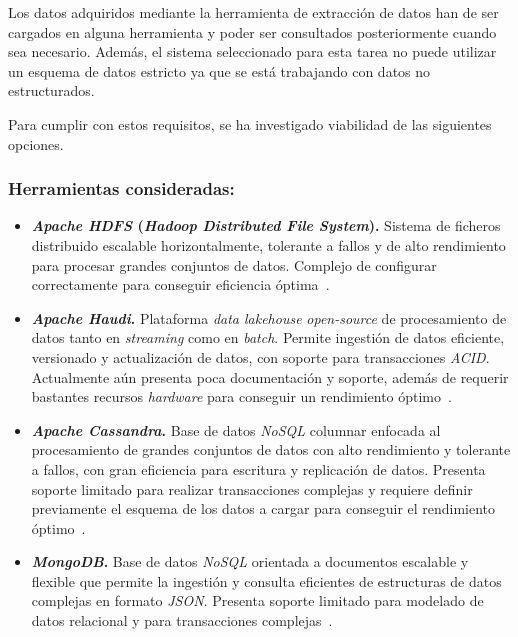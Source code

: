Los datos adquiridos mediante la herramienta de extracción de datos han de ser cargados en alguna herramienta y poder ser consultados posteriormente cuando sea necesario. Además, el sistema seleccionado para esta tarea no puede utilizar un esquema de datos estricto ya que se está trabajando con datos no estructurados.

Para cumplir con estos requisitos, se ha investigado viabilidad de las siguientes opciones.

\subsubsection{Herramientas consideradas:}

\begin{itemize}
    \item \textbf{\textit{Apache HDFS} (\textit{Hadoop Distributed File System}).} Sistema de ficheros distribuido escalable horizontalmente, tolerante a fallos y de alto rendimiento para procesar grandes conjuntos de datos. Complejo de configurar correctamente para conseguir eficiencia óptima~\cite{hdfsArchitecture}.
    \item \textbf{\textit{Apache Haudi}.} Plataforma \textit{data lakehouse} \textit{open-source} de procesamiento de datos tanto en \textit{streaming} como en \textit{batch}. Permite ingestión de datos eficiente, versionado y actualización de datos, con soporte para transacciones \textit{ACID}. Actualmente aún presenta poca documentación y soporte, además de requerir bastantes recursos \textit{hardware} para conseguir un rendimiento óptimo~\cite{hudiOverview}.
    \item \textbf{\textit{Apache Cassandra}.} Base de datos \textit{NoSQL} columnar enfocada al procesamiento de grandes conjuntos de datos con alto rendimiento y tolerante a fallos, con gran eficiencia para escritura y replicación de datos. Presenta soporte limitado para realizar transacciones complejas y requiere definir previamente el esquema de los datos a cargar para conseguir el rendimiento óptimo~\cite{cassandraOverview}.
    \item \textbf{\textit{MongoDB}.} Base de datos \textit{NoSQL} orientada a documentos escalable y flexible que permite la ingestión y consulta eficientes de estructuras de datos complejas en formato \textit{JSON}. Presenta soporte limitado para modelado de datos relacional y para transacciones complejas~\cite{mongodbArchitecture}.
\end{itemize}

